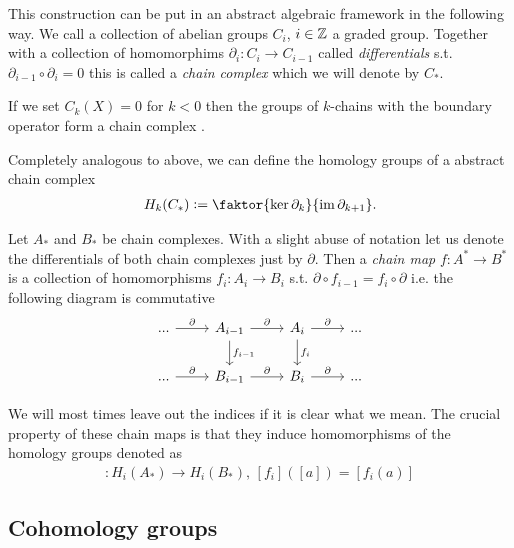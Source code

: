 \documentclass[../master_thesis.tex]{subfiles}
\begin{document}
This construction can be put in an abstract algebraic framework in the following 
way. We call a collection of abelian groups $C_i$, $i\in \mathbb{Z}$ a graded group.                                                   
Together with a collection of homomorphims $\partial_i: C_i \rightarrow C_{i-1}$ 
called \textit{differentials}
s.t. $\partial_{i-1} \circ \partial_i = 0$ this is called a \textit{chain complex} which 
we will denote by $C_*$. 

\begin{example}
    If we set $C_k(X) = {0}$ for $k < 0$ then the groups of $k$-chains with 
    the boundary operator form a chain complex . 
\end{example}

Completely analogous to above, we can define the homology groups 
of a abstract chain complex
\begin{align*}
    H_k(C_*) \vcentcolon= \faktor{\ker \partial_k}{\Ima \partial_{k+1}}.
\end{align*}

\begin{definition}
    Let $A_*$ and $B_*$ be chain complexes. With a slight abuse of notation
    let us denote the differentials of 
    both chain complexes just by $\partial$.
    Then a \textit{chain map} $f: A^* \rightarrow B^*$ is a collection 
    of homomorphisms $f_i: A_i \rightarrow B_i$ s.t. 
    $\partial \circ f_{i-1} = f_i \circ \partial$ i.e. the following diagram is commutative
    \begin{equation*}
        \begin{tikzcd}
            ... \arrow[r, "\partial"] 
                & A_{i-1} \arrow[r, "\partial"] \arrow[d, "f_{i-1}"] & A_i \arrow[r, "\partial"] \arrow[d, "f_i"] 
                & ...\\
            ... \arrow[r, "\partial"] 
                & B_{i-1} \arrow[r, "\partial"] & B_i \arrow[r, "\partial"] 
                & ...
        \end{tikzcd}
    \end{equation*}
\end{definition}
We will most times leave out the 
indices if it is clear what we mean.
The crucial property of these chain maps is that they induce homomorphisms of
the homology groups denoted as
\begin{align*}
    [f_i]: H_i(A_*) \rightarrow H_i(B_*), \, [f_i]([a]) = [f_i(a)]
\end{align*}

\subsection{Cohomology groups}\label{sec:cohomology_groups}
\end{document}
